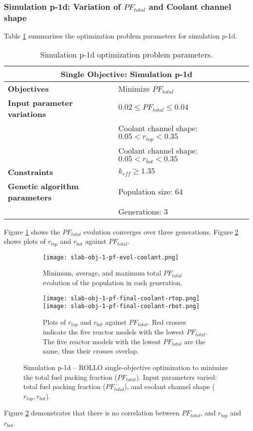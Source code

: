 \subsubsection{Simulation p-1d: Variation of $PF_{total}$ and Coolant channel shape}
Table \ref{tab:simulationp1d} summarizes the optimization problem parameters for 
simulation p-1d.  
\begin{table}[htbp!]
    \centering
    \onehalfspacing
    \caption{Simulation p-1d optimization problem parameters.}
	\label{tab:simulationp1d}
    \footnotesize
    \begin{tabular}{l|p{6.5cm}}
    \hline 
    \multicolumn{2}{c}{\textbf{Single Objective: Simulation p-1d}} \\
    \hline 
    \textbf{Objectives} & Minimize $PF_{total}$\\
    \hline 
    \textbf{Input parameter variations} & $0.02 \leq PF_{total} \leq 0.04$ \\
    & Coolant channel shape: $0.05<r_{top}<0.35$ \\
    & Coolant channel shape: $0.05<r_{bot}<0.35$ \\
    \hline
    \textbf{Constraints} & $k_{eff} \geq 1.35$\\ 
    \hline 
    \textbf{Genetic algorithm parameters} & Population size: 64 \\
    & Generations: 3 \\
    \hline
    \end{tabular}
\end{table}
Figure \ref{fig:slab-obj-1-pf-evol-coolant} shows the $PF_{total}$ evolution converges 
over three generations.  
Figure \ref{fig:slab-obj-1-pf-final-coolant} shows plots of $r_{top}$ and $r_{bot}$ 
against $PF_{total}$.  
\begin{figure}[htbp!]
    \centering
    \begin{subfigure}{\textwidth}
        \texttt{[image: slab-obj-1-pf-evol-coolant.png]}
        \caption{Minimum, average, and maximum total $PF_{total}$ evolution of the 
        population in each generation.}
        \label{fig:slab-obj-1-pf-evol-coolant} 
    \end{subfigure}
    \begin{subfigure}{\textwidth}
        \texttt{[image: slab-obj-1-pf-final-coolant-rtop.png]}
        \texttt{[image: slab-obj-1-pf-final-coolant-rbot.png]}
        \caption{Plots of $r_{top}$ and $r_{bot}$ against $PF_{total}$. 
        Red crosses indicate the five reactor models with the lowest $PF_{total}$.
        The five reactor models with the lowest $PF_{total}$ are the same, thus 
        their crosses overlap.}
        \label{fig:slab-obj-1-pf-final-coolant} 
    \end{subfigure}
    \caption{Simulation p-1d -- ROLLO single-objective optimization to minimize 
    the total fuel packing fraction ($PF_{total}$). 
    Input parameters varied: total fuel packing fraction 
    ($PF_{total}$), and coolant channel shape ($r_{top}, r_{bot}$).}
    \label{fig:slab-obj-1-pf-coolant}
\end{figure}
Figure \ref{fig:slab-obj-1-pf-final-coolant} demonstrates that there is no correlation 
between $PF_{total}$, and $r_{top}$ and $r_{bot}$.

